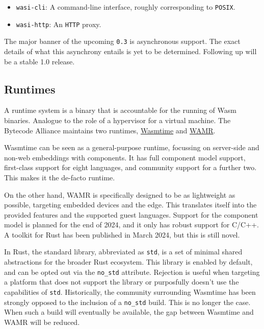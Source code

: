 \begin{itemize}
    \item \texttt{wasi-cli}: A command-line interface, roughly corresponding to \texttt{POSIX}.
    \item \texttt{wasi-http}: An \texttt{HTTP} proxy.
\end{itemize}

The major banner of the upcoming \texttt{0.3} is asynchronous support. The exact details of what this asynchrony entails is yet to be determined. Following up will be a stable 1.0 release.

\subsection{Runtimes}
\label{sec:runtimes}

A runtime system is a binary that is accountable for the running of \gls{Wasm} binaries. Analogue to the role of a hypervisor for a virtual machine. The Bytecode Alliance maintains two runtimes, \href{https://github.com/bytecodealliance/wasmtime}{Wasmtime} and \href{https://github.com/bytecodealliance/wasm-micro-runtime}{WAMR}.

Wasmtime can be seen as a general-purpose runtime, focussing on server-side and non-web embeddings with components. It has full component model support, first-class support for eight languages, and community support for a further two. This makes it the de-facto runtime. 

On the other hand, \gls{WAMR} is specifically designed to be as lightweight as possible, targeting embedded devices and the edge. This translates itself into the provided features and the supported guest languages. Support for the component model is planned for the end of 2024, and it only has robust support for C/C++. A toolkit for Rust has been published in March 2024, but this is still novel.

In Rust, the standard library, abbreviated as \texttt{std}, is a set of minimal shared abstractions for the broader Rust ecosystem. This library is enabled by default, and can be opted out via the \texttt{no\_std} attribute. Rejection is useful when targeting a platform that does not support the library or purposfully doesn't use the capabilities of \texttt{std}. Historically, the community surrounding Wasmtime has been strongly opposed to the inclusion of a \texttt{no\_std} build. This is no longer the case. When such a build will eventually be available, the gap between Wasmtime and \gls{WAMR} will be reduced.

